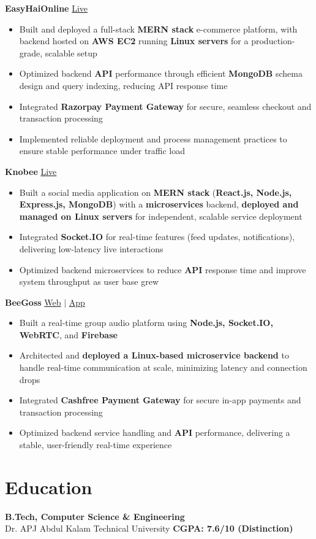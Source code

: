 \documentclass[letterpaper,10pt]{article}
\begin{document}
\textbf{EasyHaiOnline} \hfill \href{https://easyhaionline.com/}{Live}
\begin{itemize}
\item Built and deployed a full-stack \textbf{MERN stack} e-commerce platform, with backend hosted on \textbf{AWS EC2} running \textbf{Linux servers} for a production-grade, scalable setup
\item Optimized backend \textbf{API} performance through efficient \textbf{MongoDB} schema design and query indexing, reducing API response time
\item Integrated \textbf{Razorpay Payment Gateway} for secure, seamless checkout and transaction processing
\item Implemented reliable deployment and process management practices to ensure stable performance under traffic load
\end{itemize}

\textbf{Knobee} \hfill \href{https://knobee.app/}{Live}
\begin{itemize}
\item Built a social media application on \textbf{MERN stack} (\textbf{React.js, Node.js, Express.js, MongoDB}) with a \textbf{microservices} backend, \textbf{deployed and managed on Linux servers} for independent, scalable service deployment
\item Integrated \textbf{Socket.IO} for real-time features (feed updates, notifications), delivering low-latency live interactions
\item Optimized backend microservices to reduce \textbf{API} response time and improve system throughput as user base grew
\end{itemize}

\textbf{BeeGoss} \hfill \href{https://beegoss.knobee.app/}{Web} \;$|$\; \href{https://play.google.com/store/apps/details?id=com.beegoss&hl=en_IN}{App}
\begin{itemize}
\item Built a real-time group audio platform using \textbf{Node.js, Socket.IO, WebRTC}, and \textbf{Firebase}
\item Architected and \textbf{deployed a Linux-based microservice backend} to handle real-time communication at scale, minimizing latency and connection drops
\item Integrated \textbf{Cashfree Payment Gateway} for secure in-app payments and transaction processing
\item Optimized backend service handling and \textbf{API} performance, delivering a stable, user-friendly real-time experience
\end{itemize}

\section{Education}
\small
\textbf{B.Tech, Computer Science \& Engineering} \\
Dr. APJ Abdul Kalam Technical University \hfill \textbf{CGPA: 7.6/10 (Distinction)}
\end{document}
